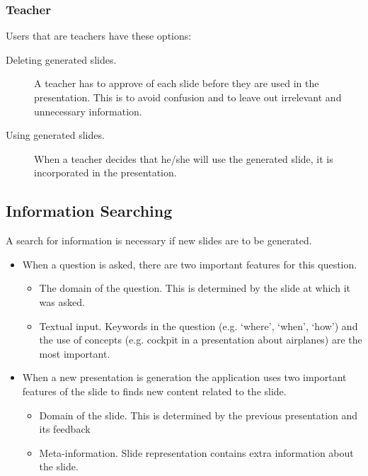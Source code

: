 \documentclass[11pt]{article}
\begin{document}
\subsubsection{Teacher}
Users that are teachers have these options: 
\begin{description}
\item[Deleting generated slides.] A teacher has to approve of each slide before they are used in the presentation. This is to avoid confusion and to leave out irrelevant and unnecessary information.
\item[Using generated slides.] When a teacher decides that he/she will use the generated slide, it is incorporated in the presentation. 
\end{description}

\subsection{Information Searching}
A search for information is necessary if new slides are to be generated.
\begin{itemize}
\item When a question is asked, there are two important features for this question.
\begin{itemize}
\item The domain of the question. This is determined by the slide at which it was asked. 
\item Textual input. Keywords in the question (e.g. `where’, `when’, `how’) and the use of concepts (e.g. cockpit in a presentation about airplanes) are the most important.
\end{itemize}
\item When a new presentation is generation the application uses two important features of the slide to finds new content related to the slide.
\begin{itemize}
\item Domain of the slide. This is determined by the previous presentation and its feedback
\item Meta-information. Slide representation contains extra information about the slide.
\end{itemize}
\end{itemize}
\end{document}
